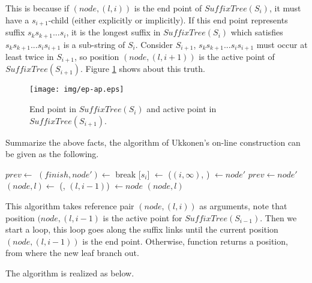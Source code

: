 \documentclass{article}
\begin{document}
This is because if $(node, (l, i))$ is the end point of $SuffixTree(S_i)$,
it must have a $s_{i+1}$-child (either explicitly or implicitly).
If this end point represents suffix $s_ks_{k+1}...s_i$, it is the longest
suffix in $SuffixTree(S_i)$ which satisfies $s_ks_{k+1}...s_is_{i+1}$ is a sub-string
of $S_i$. Consider $S_{i+1}$, $s_ks_{k+1}...s_is_{i+1}$ must occur at least
twice in $S_{i+1}$, so position $(node, (l, i+1))$ is the active point of
$SuffixTree(S_{i+1})$. Figure \ref{fig:ep-ap} shows about this truth.

\begin{figure}[htbp]
  \centering
  \texttt{[image: img/ep-ap.eps]}
  \caption{End point in $SuffixTree(S_i)$ and active point in $SuffixTree(S_{i+1})$.}
  \label{fig:ep-ap}
\end{figure}

Summarize the above facts, the algorithm of Ukkonen's on-line construction can
be given as the following.

\begin{algorithmic}[1]
  \State $prev \gets$   %
  \Loop {}
    \State $(finish, node') \gets$ 
      \State break
    \EndIf
    \State {}[$s_i$] $\gets$ ($(i, \infty)$, )
    \State {} $\gets node'$
    \State $prev \gets node'$
    \State $(node, l) \gets $ (, $(l, i-1)$)
  \EndLoop
  \State {} $\gets node$
  \State \Return $(node, l)$ 
\EndFunction
\end{algorithmic}

This algorithm takes reference pair $(node, (l, i))$ as arguments, note that
position $(node, (l, i-1)$ is the active point for $SuffixTree(S_{i-1})$.
Then we start a loop, this loop goes along the suffix links until
the current position $(node, (l, i-1))$ is the end point. Otherwise,
function  returns a position, from
where the new leaf branch out.

The  algorithm is realized as below.
\end{document}
